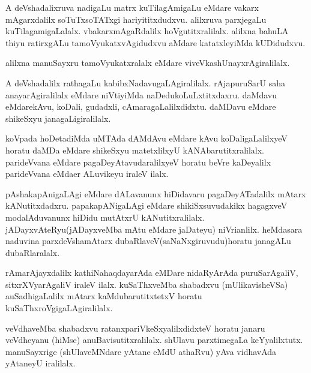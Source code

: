 \documentclass{article}
\begin{document}
\begin{mn}%
A deVshadalixruva nadigaLu matrx kuTilagAmigaLu eMdare vakarx mAgarxdalilx soTuTxsoTATxgi 
hariyititxdudxvu. alilxruva parxjegaLu kuTilagamigaLalalx. vbakarxmAgaRdalilx 
hoVgutitxralilalx. alilxna bahuLA thiyu ratirxgALu tamoVyukatxvAgidudxvu aMdare 
katatxleyiMda kUDidudxvu.
\end{mn}

\begin{mn}%
alilxna manuSayxru tamoVyukatxralalx eMdare viveVkashUnayxrAgiralilalx.
\end{mn}

\begin{mn}%
A deVshadalilx rathagaLu kabibxNadavugaLAgiralilalx. rAjapuruSarU saha anayarAgiralilalx 
eMdare niVtiyiMda naDedukoLuLxtitxdaxru. daMdavu eMdarekAvu, koDali, gudadxli, 
cAmaragaLalilxdidxtu. daMDavu eMdare shikeSxyu janagaLigiralilalx.
\end{mn}

\begin{mn}%
koVpada hoDetadiMda uMTAda dAMdAvu eMdare kAvu koDaligaLalilxyeV horatu daMDa eMdare 
shikeSxyu matetxlilxyU kANAbarutitxralilalx. parideVvana eMdare pagaDeyAtavudaralilxyeV 
horatu beVre kaDeyalilx parideVvana eMdaer ALuvikeyu iraleV ilalx.
\end{mn}

\begin{mn}%
pAshakapAnigaLAgi eMdare dALavanunx hiDidavaru pagaDeyATadalilx mAtarx kANutitxdadxru. 
papakapANigaLAgi eMdare shikiSxsuvudakikx hagagxveV modalAduvanunx hiDidu mutAtxrU 
kANutitxralilalx. jADayxvAteRyu(jADayxveMba mAtu eMdare jaDateyu) niVrianlilx. heMdasara 
naduvina parxdeVshamAtarx dubaRlaveV(saNaNxgiruvudu)horatu janagALu dubaRlaralalx.
\end{mn}

\begin{mn}%
rAmarAjayxdalilx kathiNahaqdayarAda eMDare nidaRyArAda puruSarAgaliV, sitxrXVyarAgaliV iraleV
ilalx. kuSaThxveMba shabadxvu (mUlikavisheVSa) auSadhigaLalilx mAtarx kaMdubarutitxtetxV 
horatu kuSaThxroVgigaLAgiralilalx.
\end{mn}

\begin{mn}%
veVdhaveMba shabadxvu ratanxpariVkeSxyalilxdidxteV horatu janaru veVdheyanu (hiMse)
anuBavisutitxralilalx. shUlavu parxtimegaLa keYyalilxtutx. manuSayxrige (shUlaveMNdare 
yAtane eMdU athaRvu) yAva vidhavAda yAtaneyU iralilalx.
\end{mn}
\end{document}
